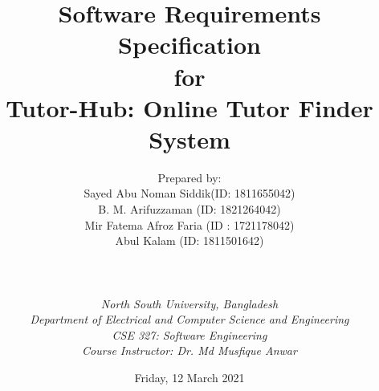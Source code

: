 
\def\Company{Tutor-Hub}
\def\Institute{\textit{North South University, Bangladesh}}
\def\Department{\textit{ Department of Electrical and Computer Science and Engineering}}
\def\Course{\textit{CSE 327: Software Engineering}}
\def\Assistant{\textit{Course Instructor: Dr. Md Musfique Anwar}}
\def\Docent{\textit{}}
\def\BoldTitle{Software Requirements Specification}

\def\Subtitle{for \\ Tutor-Hub: Online Tutor Finder System\\}
\def\Authors{Prepared by: \\  
Sayed Abu Noman Siddik(ID: 1811655042) \\
 B. M. Arifuzzaman (ID: 1821264042) \\
 Mir Fatema Afroz Faria (ID : 1721178042) \\
Abul Kalam (ID: 1811501642) \\
} 
\def\Shortname{A.Sandu}


\title{\textbf{\BoldTitle}\\\Subtitle}
\author{\Authors \\ \\ \\ \Institute\\  \Department\\ \Course\\  \Assistant \Docent\\}
\date{Friday, 12  March 2021}

